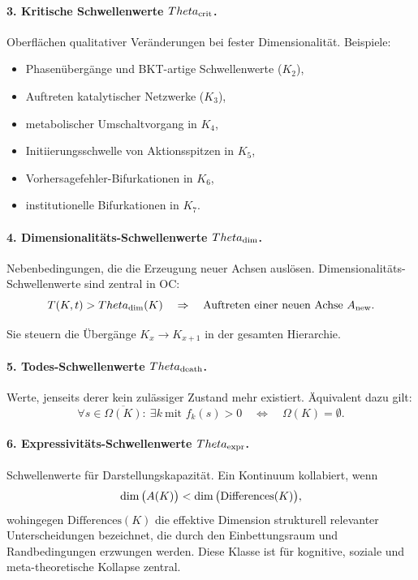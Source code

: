 \paragraph{3. Kritische Schwellenwerte \(\Theta_{\rm crit}\).}
Oberflächen qualitativer Veränderungen bei fester Dimensionalität.
Beispiele:
\begin{itemize}
    \item Phasenübergänge und BKT-artige Schwellenwerte (\(K_2\)),
    \item Auftreten katalytischer Netzwerke (\(K_3\)),
    \item metabolischer Umschaltvorgang in \(K_4\),
    \item Initiierungsschwelle von Aktionsspitzen in \(K_5\),
    \item Vorhersagefehler-Bifurkationen in \(K_6\),
    \item institutionelle Bifurkationen in \(K_7\).
\end{itemize}

\paragraph{4. Dimensionalitäts-Schwellenwerte \(\Theta_{\rm dim}\).}
Nebenbedingungen, die die Erzeugung neuer Achsen auslösen.
Dimensionalitäts-Schwellenwerte sind zentral in OC:
\[
   T(K,t) > \Theta_{\rm dim}(K)
   \quad\Rightarrow\quad
   \text{Auftreten einer neuen Achse } A_{\rm new}.
\]

Sie steuern die Übergänge \(K_x \to K_{x+1}\) in der gesamten Hierarchie.

\paragraph{5. Todes-Schwellenwerte \(\Theta_{\rm death}\).}
Werte, jenseits derer kein zulässiger Zustand mehr existiert.
Äquivalent dazu gilt:
\[
   \forall s\in\overline{\Omega(K)}:\ \exists k\ \text{mit } f_k(s) > 0
   \quad\Longleftrightarrow\quad
   \Omega(K)=\emptyset.
\]

\paragraph{6. Expressivitäts-Schwellenwerte \(\Theta_{\rm expr}\).}
Schwellenwerte für Darstellungskapazität. Ein Kontinuum kollabiert, wenn
\[
   \dim\big(A(K)\big)
   <
   \dim\big({\rm Differences}(K)\big),
\]
wohingegen \(\mathrm{Differences}(K)\) die effektive Dimension strukturell relevanter
Unterscheidungen bezeichnet, die durch den Einbettungsraum und
Randbedingungen erzwungen werden. Diese Klasse ist für kognitive, soziale und
meta-theoretische Kollapse zentral.

